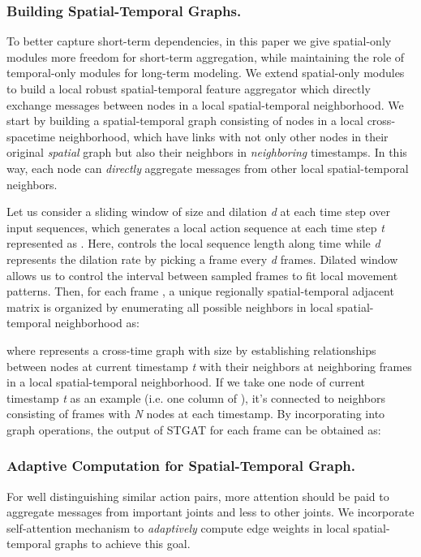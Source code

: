 \documentclass[runningheads]{llncs}
\begin{document}
\subsubsection{Building Spatial-Temporal Graphs.}
To better capture short-term dependencies, in this paper we give spatial-only modules more freedom for short-term aggregation, while maintaining the role of temporal-only modules for long-term modeling. We extend spatial-only modules to build a local robust spatial-temporal feature aggregator which directly exchange messages between nodes in a local spatial-temporal neighborhood. We start by building a spatial-temporal graph consisting of nodes in a local cross-spacetime neighborhood, which have links with not only other nodes in their original \textit{spatial} graph but also their neighbors in \textit{neighboring} timestamps. In this way, each node can \textit{directly} aggregate messages from other local spatial-temporal neighbors. 
  
Let us consider a sliding window of size  and dilation \textit{d} at each time step over input sequences, which generates a local action sequence at each time step \textit{t} represented as . Here,  controls the local sequence length along time while \textit{d} represents the dilation rate by picking a frame every \textit{d} frames. Dilated window allows us to control the interval between sampled frames to fit local movement patterns. Then, for each frame , a unique regionally spatial-temporal adjacent matrix  is organized by enumerating all possible neighbors in local spatial-temporal neighborhood  as:

where  represents a cross-time graph with size  by establishing relationships between nodes at current timestamp \textit{t} with their neighbors at  neighboring frames in a local spatial-temporal neighborhood. If we take one node of current timestamp \textit{t} as an example (i.e. one column of ), it's connected to  neighbors consisting of   frames with \textit{N} nodes at each timestamp. By incorporating  into graph operations, the output of STGAT for each frame  can be obtained as:

\subsubsection{Adaptive Computation for Spatial-Temporal Graph.}
For well distinguishing similar action pairs, more attention should be paid to aggregate messages from important joints and less to other joints. We incorporate self-attention mechanism to \textit{adaptively} compute edge weights in local spatial-temporal graphs to achieve this goal. 
\end{document}
